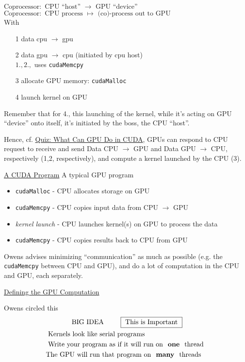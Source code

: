 \documentclass[10pt]{amsart}
\begin{document}
\begin{multicols*}{2}
$\text{Coprocessor} : \text{ CPU ``host'' } \to \text{ GPU ``device'' } $ \\
$\text{Coprocessor} : \text{ CPU process } \mapsto \text{ (co)-process out to GPU } $ \\

With
\begin{enumerate}
  \item[1] data cpu $\to $ gpu
  \item[2] data gpu $\to$ cpu \qquad (initiated by cpu host) \\

$1.,2.,$ uses \verb|cudaMemcpy| 
  \item[3] allocate GPU memory: \verb|cudaMalloc|
  \item[4] launch kernel on GPU
  \end{enumerate}
Remember that for 4., this launching of the kernel, while it's acting on GPU ``device'' onto itself, it's initiated by the boss, the CPU ``host''.

Hence, cf. \href{https://classroom.udacity.com/courses/cs344/lessons/55120467/concepts/670489380923}{Quiz: What Can GPU Do in CUDA}, GPUs can respond to CPU request to receive and send Data CPU $\to $ GPU and Data GPU $\to $ CPU, respectively (1,2, respectively), and compute a kernel launched by the CPU (3).


\href{https://classroom.udacity.com/courses/cs344/lessons/55120467/concepts/670742800923}{A CUDA Program}
A typical GPU program

\begin{itemize}
\item \verb|cudaMalloc| - CPU allocates storage on GPU 
\item \verb|cudaMemcpy| - CPU copies input data from CPU $\to $ GPU 
\item \emph{kernel launch} - CPU launches kernel(s) on GPU to process the data 
\item \verb|cudaMemcpy| - CPU copies results back to CPU from GPU
  \end{itemize}

Owens advises minimizing ``communication'' as much as possible (e.g. the \verb|cudaMemcpy| between CPU and GPU), and do a lot of computation in the CPU and GPU, each separately.

\href{https://classroom.udacity.com/courses/cs344/lessons/55120467/concepts/672300540923}{Defining the GPU Computation}

Owens circled this
{\Large
  \[
  \begin{gathered}
\text{ BIG IDEA } \qquad \, \boxed{ \text{ This is Important } }  \\
\begin{aligned} 
& \text{ Kernels look like serial programs } \\
  & \text{ Write your program as if it will run on \textbf{ one } thread } \\
  & \text{The GPU will run that program on \textbf{ many } threads}
  \end{aligned}
\end{gathered}
\]
}


\end{multicols*}
\end{document}
